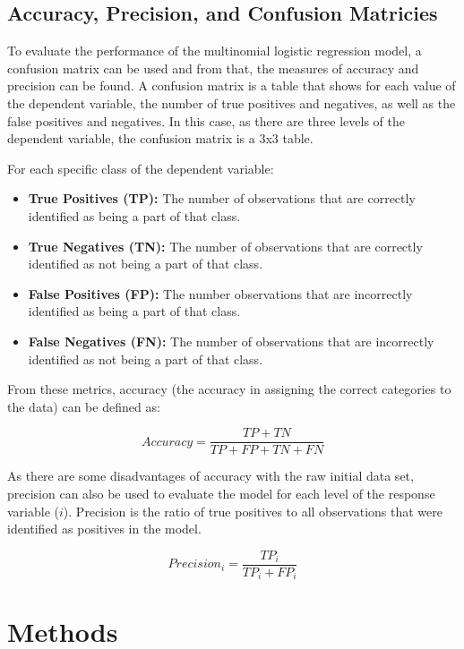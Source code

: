 \documentclass[
  letterpaper,
  DIV=11,
  numbers=noendperiod]{scrartcl}
\providecommand{\tightlist}{%
  \setlength{\itemsep}{0pt}\setlength{\parskip}{0pt}}\usepackage{longtable,booktabs,array}
\begin{document}
\subsection{Accuracy, Precision, and Confusion
Matricies}\label{accuracy-precision-and-confusion-matricies}

To evaluate the performance of the multinomial logistic regression
model, a confusion matrix can be used and from that, the measures of
accuracy and precision can be found. A confusion matrix is a table that
shows for each value of the dependent variable, the number of true
positives and negatives, as well as the false positives and negatives.
In this case, as there are three levels of the dependent variable, the
confusion matrix is a 3x3 table.

For each specific class of the dependent variable:

\begin{itemize}
\tightlist
\item
  \textbf{True Positives (TP):} The number of observations that are
  correctly identified as being a part of that class.
\item
  \textbf{True Negatives (TN):} The number of observations that are
  correctly identified as not being a part of that class.
\item
  \textbf{False Positives (FP):} The number observations that are
  incorrectly identified as being a part of that class.
\item
  \textbf{False Negatives (FN):} The number of observations that are
  incorrectly identified as not being a part of that class.
\end{itemize}

From these metrics, accuracy (the accuracy in assigning the correct
categories to the data) can be defined as:

\[ Accuracy = \frac{TP + TN}{TP + FP + TN + FN}\]

As there are some disadvantages of accuracy with the raw initial data
set, precision can also be used to evaluate the model for each level of
the response variable (\(i\)). Precision is the ratio of true positives
to all observations that were identified as positives in the model.

\[Precision_i = \frac{TP_i}{TP_i + FP_i}\]

\section{Methods}\label{methods}
\end{document}
